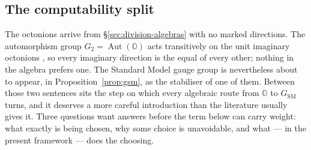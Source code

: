 %
%
%

\subsection{The computability split}
\label{sec:computability-split}

The octonions arrive from \S\ref{sec:division-algebras} with no marked
directions. The automorphism group $G_2 = \operatorname{Aut}(\mathbb{O})$
acts transitively on the unit imaginary octonions
\autocite{baez2002octonions}, so every imaginary direction is the equal of
every other; nothing in the algebra prefers one. The Standard Model gauge
group is nevertheless about to appear, in Proposition~\ref{prop:gsm}, as
the stabiliser of one of them. Between those two sentences sits the step on
which every algebraic route from $\mathbb{O}$ to $G_{\mathrm{SM}}$ turns,
and it deserves a more careful introduction than the literature usually
gives it. Three questions want answers before the term below can carry
weight: what exactly is being chosen, why some choice is unavoidable, and
what --- in the present framework --- does the choosing.

